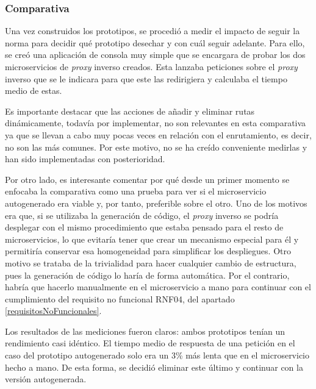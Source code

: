 \documentclass[11pt,spanish,listoffigures]{tfgetsinf}
\begin{document}


			\subsubsection{Comparativa}

Una vez construidos los prototipos, se procedió a medir el impacto de seguir la norma para decidir qué prototipo desechar y con cuál seguir adelante. Para ello, se creó una aplicación de consola muy simple que se encargara de probar los dos microservicios de \emph{proxy} inverso creados. Esta lanzaba peticiones sobre el \emph{proxy} inverso que se le indicara para que este las redirigiera y calculaba el tiempo medio de estas.


Es importante destacar que las acciones de añadir y eliminar rutas dinámicamente, todavía por implementar, no son relevantes en esta comparativa ya que se llevan a cabo muy pocas veces en relación con el enrutamiento, es decir, no son las más comunes. Por este motivo, no se ha creído conveniente medirlas y han sido implementadas con posterioridad.

Por otro lado, es interesante comentar por qué desde un primer momento se enfocaba la comparativa como una prueba para ver si el microservicio autogenerado era viable y, por tanto, preferible sobre el otro. Uno de los motivos era que, si se utilizaba la generación de código, el \emph{proxy} inverso se podría desplegar con el mismo procedimiento que estaba pensado para el resto de microservicios, lo que evitaría tener que crear un mecanismo especial para él y permitiría conservar esa homogeneidad para simplificar los despliegues. Otro motivo se trataba de la trivialidad para hacer cualquier cambio de estructura, pues la generación de código lo haría de forma automática. Por el contrario, habría que hacerlo manualmente en el microservicio a mano para continuar con el cumplimiento del requisito no funcional RNF04, del apartado \ref{requisitosNoFuncionales}.

Los resultados de las mediciones fueron claros: ambos prototipos tenían un rendimiento casi idéntico. El tiempo medio de respuesta de una petición en el caso del prototipo autogenerado solo era un 3\% más lenta que en el microservicio hecho a mano. De esta forma, se decidió eliminar este último y continuar con la versión autogenerada.
\end{document}
